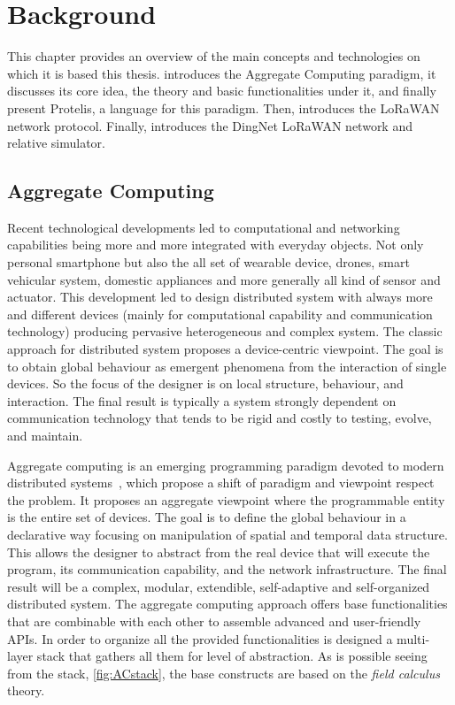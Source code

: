 \chapter{Background}
\label{chap:background}
This chapter provides an overview of the main concepts and technologies on which it is based this thesis.  introduces the Aggregate Computing paradigm, it discusses its core idea, the theory and basic functionalities under it, and finally present Protelis, a language for this paradigm. 
Then,  introduces the LoRaWAN network protocol. 
Finally,  introduces the DingNet LoRaWAN network and relative simulator. 

\section{Aggregate Computing}
\label{sec:AC}
Recent technological developments led to computational and networking capabilities being more and more integrated with everyday objects. 
% 
Not only personal smartphone but also the all set of wearable device, drones, smart vehicular system, domestic appliances and more generally all kind of sensor and actuator.
% 
This development led to design distributed system with always more and different devices (mainly for computational capability and communication technology) producing pervasive heterogeneous and complex system.
% 
The classic approach for distributed system proposes a device-centric viewpoint.
% 
The goal is to obtain global behaviour as emergent phenomena from the interaction of single devices. 
% 
So the focus of the designer is on local structure, behaviour, and interaction. 
% 
The final result is typically a system strongly dependent on communication technology that tends to be rigid and costly to testing, evolve, and maintain.
 
Aggregate computing is an emerging programming paradigm devoted to modern distributed systems~\cite{BealIEEEComputer2015}, which propose a shift of paradigm and viewpoint respect the problem. 
% 
It proposes an aggregate viewpoint where the programmable entity is the entire set of devices.
% 
The goal is to define the global behaviour in a declarative way focusing on manipulation of spatial and temporal data structure. This allows the designer to abstract from the real device that will execute the program, its communication capability, and the network infrastructure. 
% 
The final result will be a complex, modular, extendible, self-adaptive and self-organized distributed system.
% 
The aggregate computing approach offers base functionalities that are combinable with each other to assemble advanced and user-friendly APIs. In order to organize all the provided functionalities is designed a multi-layer stack that gathers all them for level of abstraction. 
As is possible seeing from the stack, \autoref{fig:ACstack}, the base constructs are based on the \textit{field calculus} theory.

